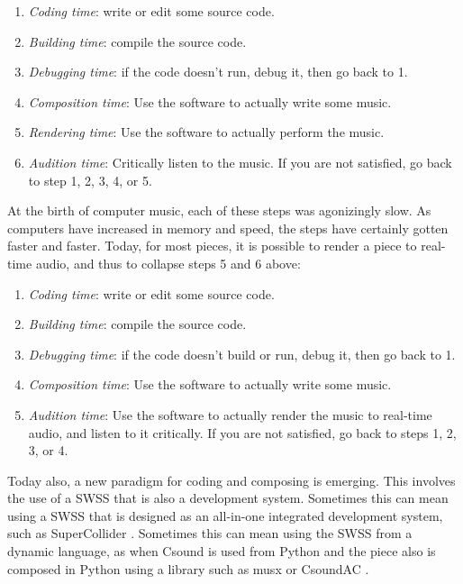 \documentclass[letterpaper, 12pt]{article}
\begin{document}
\begin{enumerate}
\item \textit{Coding time}: write or edit some source code.
\item \textit{Building time}: compile the source code.
\item \textit{Debugging time}: if the code doesn't run, debug it, then go back to 1.
\item \textit{Composition time}: Use the software to actually write some music.
\item \textit{Rendering time}: Use the software to actually perform the music.
\item \textit{Audition time}: Critically listen to the music. If you are not satisfied, go back to step 1, 2, 3, 4, or 5.
\end{enumerate}

\noindent At the birth of computer music, each of these steps was agonizingly slow. As computers have increased in memory and speed, the steps have certainly gotten faster and faster. Today, for most pieces, it is possible to render a piece to real-time audio, and thus to collapse steps 5 and 6 above:

\begin{enumerate}
\item \textit{Coding time}: write or edit some source code.
\item \textit{Building time}: compile the source code.
\item \textit{Debugging time}: if the code doesn't build or run, debug it, then go back to 1.
\item \textit{Composition time}: Use the software to actually write some music.
\item \textit{Audition time}: Use the software to actually render the music to real-time audio, and listen to it critically. If you are not satisfied, go back to steps 1, 2, 3, or 4.
\end{enumerate}

Today also, a new paradigm for coding and composing is emerging. This involves the use of a SWSS that is also a development system. Sometimes this can mean using a SWSS that is designed as an all-in-one integrated development system, such as SuperCollider \citep{supercollider, mccartney2002rethinking}. Sometimes this can mean using the SWSS from a dynamic language, as when Csound \citep{csoundmain, lazzarini2016csound, csoundbook} is used from Python \citep{python} and the piece also is composed in Python using a library such as musx \citep{musx} or CsoundAC \citep{csoundextended}.
\end{document}
